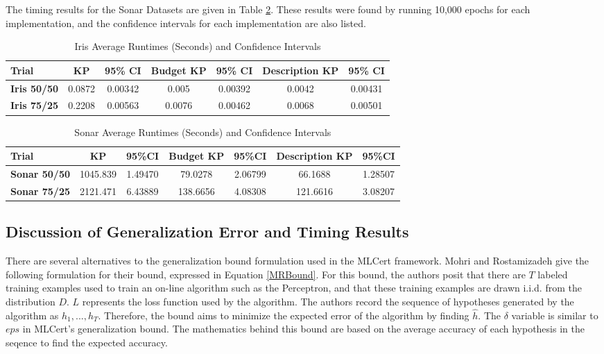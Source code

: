 The timing results for the Sonar Datasets are given in Table \ref{tab:sonartabtiming}. These results were found by running 10,000 epochs for each implementation, and the confidence intervals for each implementation are also listed.

\begin{table}[h]
 \begin{center}
  \caption{Iris Average Runtimes (Seconds) and Confidence Intervals}
  \label{tab:iristabtiming}
  \begin{tabular}{l|c|c|c|c|c|c}
  \textbf{Trial} & \textbf{KP} & \textbf{95\% CI} & \textbf{Budget KP} & \textbf{95\% CI} & \textbf{Description KP} & \textbf{95\% CI}\\
  \hline
  \textbf{Iris 50/50} & 0.0872 & 0.00342 & 0.005 & 0.00392 & 0.0042 & 0.00431\\
  \textbf{Iris 75/25} & 0.2208 & 0.00563 & 0.0076 & 0.00462 & 0.0068 & 0.00501\\
  \end{tabular}
 \end{center}
\end{table}

\begin{table}[ht]
 \begin{center}
  \caption{Sonar Average Runtimes (Seconds) and Confidence Intervals}
  \label{tab:sonartabtiming}
  \begin{tabular}{l|c|c|c|c|c|c}
  \textbf{Trial} & \textbf{KP} & \textbf{95\%CI} & \textbf{Budget KP} & \textbf{95\%CI} & \textbf{Description KP} & \textbf{95\%CI}\\
  \hline
  \textbf{Sonar 50/50} & 1045.839 & 1.49470 & 79.0278 & 2.06799 & 66.1688 & 1.28507\\
  \textbf{Sonar 75/25} & 2121.471 & 6.43889 & 138.6656 & 4.08308 & 121.6616 & 3.08207\\
  \end{tabular}
 \end{center}
\end{table}

\subsection{Discussion of Generalization Error and Timing Results}\label{ResultsDiscussion}
There are several alternatives to the generalization bound formulation used in the MLCert framework. Mohri and Rostamizadeh \cite{MR13} give the following formulation for their bound, expressed in Equation \ref{MRBound}. For this bound, the authors posit that there are $T$ labeled training examples used to train an on-line algorithm such as the Perceptron, and that these training examples are drawn i.i.d. from the distribution $D$. $L$ represents the loss function used by the algorithm. The authors record the sequence of hypotheses generated by the algorithm as $h_1,...,h_T$. Therefore, the bound aims to minimize the expected error of the algorithm by finding $\hat{h}$. The $\delta$ variable is similar to $eps$ in MLCert's generalization bound. The mathematics behind this bound are based on the average accuracy of each hypothesis in the seqence to find the expected accuracy.

